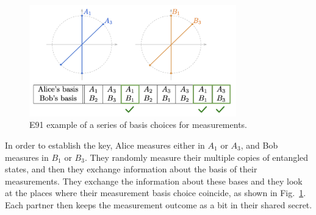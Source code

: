 \begin{figure}[H]
    \centering
    \includegraphics[width=0.8\textwidth]{lesson10/e91-example.png}
        \caption{E91 example of a series of basis choices for measurements.}
    \label{fig:e91-example}
\end{figure}

In order to establish the key, Alice measures either in $A_1$ or $A_3$, and Bob measures in $B_1$ or $B_3$. They randomly measure their multiple copies of entangled states, and then they exchange information about the basis of their measurements. 
They exchange the information about these bases and they look at the places where their measurement basis choice coincide, as shown in Fig.~\ref{fig:e91-example}.  Each partner then keeps the measurement outcome as a bit in their shared secret.

